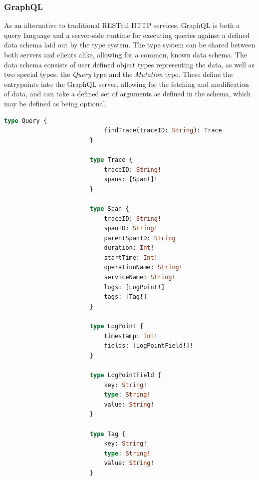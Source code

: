 \documentclass[12pt,pdftex,titlepage]{report}
\begin{document}
                \subsubsection{GraphQL}
                    As an alternative to traditional RESTful HTTP services, GraphQL is both a query language and a server-side runtime for executing queries against a defined data schema
                    laid out by the type system. The type system can be shared between both servers and clients alike, allowing for a common, known data schema. The data schema consists of 
                    user defined object types representing the data, as well as two special types: the \textit{Query} type and the \textit{Mutation} type. These define the entrypoints into
                    the GraphQL server, allowing for the fetching and modification of data, and can take a defined set of arguments as defined in the schema, which may be defined as being
                    optional.

                    \begin{lstlisting}[caption={The base GraphQL schema, defining a query and data types for the trace data.}, language=GraphQL, gobble=24]
                        type Query {
                            findTrace(traceID: String): Trace
                        }

                        type Trace {
                            traceID: String!
                            spans: [Span!]!
                        }

                        type Span {
                            traceID: String!
                            spanID: String!
                            parentSpanID: String
                            duration: Int!
                            startTime: Int!
                            operationName: String!
                            serviceName: String!
                            logs: [LogPoint!]
                            tags: [Tag!]
                        }

                        type LogPoint {
                            timestamp: Int!
                            fields: [LogPointField!]!
                        }

                        type LogPointField {
                            key: String!
                            type: String!
                            value: String!
                        }

                        type Tag {
                            key: String!
                            type: String!
                            value: String!
                        }
                    \end{lstlisting}
                    
\end{document}
